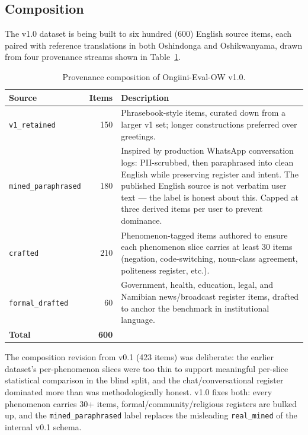 \documentclass[11pt]{article}
\begin{document}
\subsection{Composition}
\label{sec:composition}

The v1.0 dataset is being built to six hundred (600) English source
items, each paired with reference translations in both Oshindonga
and Oshikwanyama, drawn from four provenance streams shown in
Table~\ref{tab:composition}.

\begin{table}[t]
\centering
\small
\begin{tabular}{lrp{10cm}}
\toprule
\textbf{Source} & \textbf{Items} & \textbf{Description} \\
\midrule
\texttt{v1\_retained} & 150 & Phrasebook-style items, curated down from a larger v1 set; longer constructions preferred over greetings. \\
\texttt{mined\_paraphrased} & 180 & Inspired by production WhatsApp conversation logs: PII-scrubbed, then paraphrased into clean English while preserving register and intent. The published English source is not verbatim user text --- the label is honest about this. Capped at three derived items per user to prevent dominance. \\
\texttt{crafted} & 210 & Phenomenon-tagged items authored to ensure each phenomenon slice carries at least 30 items (negation, code-switching, noun-class agreement, politeness register, etc.). \\
\texttt{formal\_drafted} & 60 & Government, health, education, legal, and Namibian news/broadcast register items, drafted to anchor the benchmark in institutional language. \\
\midrule
\textbf{Total} & \textbf{600} & \\
\bottomrule
\end{tabular}
\caption{Provenance composition of Ongiini-Eval-OW v1.0.}
\label{tab:composition}
\end{table}

The composition revision from v0.1 (423 items) was deliberate: the
earlier dataset's per-phenomenon slices were too thin to support
meaningful per-slice statistical comparison in the blind split, and
the chat/conversational register dominated more than was
methodologically honest. v1.0 fixes both: every phenomenon carries
30+ items, formal/community/religious registers are bulked up, and
the \texttt{mined\_paraphrased} label replaces the misleading
\texttt{real\_mined} of the internal v0.1 schema.
\end{document}

